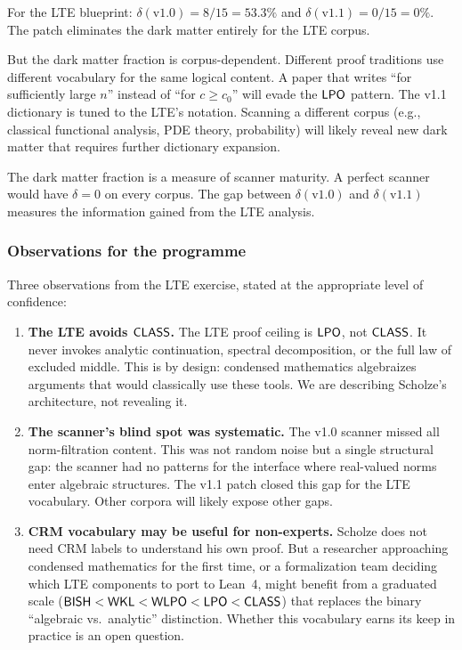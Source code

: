 For the LTE blueprint: $\delta(\text{v1.0}) = 8/15 = 53.3\%$ and
$\delta(\text{v1.1}) = 0/15 = 0\%$.  The patch eliminates the dark
matter entirely for the LTE corpus.

But the dark matter fraction is corpus-dependent.  Different proof
traditions use different vocabulary for the same logical content.
A paper that writes ``for sufficiently large $n$'' instead of
``for $c \geq c_0$'' will evade the $\textsf{LPO}$ pattern.  The v1.1
dictionary is tuned to the LTE's notation.  Scanning a different
corpus (e.g., classical functional analysis, PDE theory, probability)
will likely reveal new dark matter that requires further dictionary
expansion.

The dark matter fraction is a measure of scanner maturity.  A perfect
scanner would have $\delta = 0$ on every corpus.  The gap between
$\delta(\text{v1.0})$ and $\delta(\text{v1.1})$ measures the
information gained from the LTE analysis.

\subsubsection{Observations for the programme}\label{sec:implications}

Three observations from the LTE exercise, stated at the appropriate
level of confidence:

\begin{enumerate}[label=(\arabic*)]
\item \textbf{The LTE avoids $\textsf{CLASS}$.}
  The LTE proof ceiling is $\textsf{LPO}$, not $\textsf{CLASS}$.  It never invokes
  analytic continuation, spectral decomposition, or the full law
  of excluded middle.  This is by design: condensed mathematics
  algebraizes arguments that would classically use these tools.
  We are describing Scholze's architecture, not revealing it.

\item \textbf{The scanner's blind spot was systematic.}
  The v1.0 scanner missed all norm-filtration content.  This was
  not random noise but a single structural gap: the scanner had no
  patterns for the interface where real-valued norms enter algebraic
  structures.  The v1.1 patch closed this gap for the LTE vocabulary.
  Other corpora will likely expose other gaps.

\item \textbf{CRM vocabulary may be useful for non-experts.}
  Scholze does not need CRM labels to understand his own proof.  But
  a researcher approaching condensed mathematics for the first time,
  or a formalization team deciding which LTE components to port to
  Lean~4, might benefit from a graduated scale ($\textsf{BISH} < \textsf{WKL} <
  \textsf{WLPO} < \textsf{LPO} < \textsf{CLASS}$) that replaces the binary
  ``algebraic vs.\ analytic'' distinction.  Whether this vocabulary
  earns its keep in practice is an open question.
\end{enumerate}


